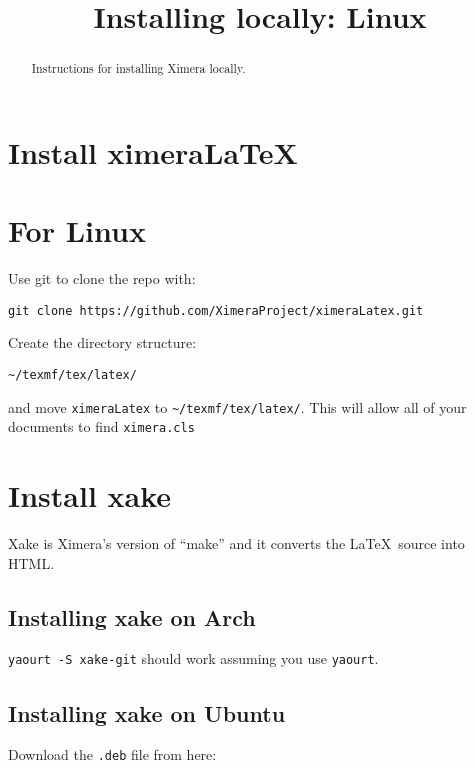 \documentclass{ximera}
\title{Installing locally: Linux}
\begin{document}
\begin{abstract}
Instructions for installing Ximera locally.
\end{abstract}
\maketitle



\section{Install ximeraLaTeX}

\section{For Linux}

Use git to clone the repo with:

\begin{verbatim}
git clone https://github.com/XimeraProject/ximeraLatex.git
\end{verbatim}

Create the directory structure:

\begin{verbatim}
~/texmf/tex/latex/
\end{verbatim}

and move \verb|ximeraLatex| to \verb|~/texmf/tex/latex/|. This will allow all of
your documents to find \verb|ximera.cls|



\section{Install xake}

Xake is Ximera's version of ``make'' and it converts the
\LaTeX\ source into HTML.

\subsection{Installing xake on Arch}

\verb!yaourt -S xake-git! should work assuming you use \texttt{yaourt}.

  
\subsection{Installing xake on Ubuntu}

Download the \verb|.deb| file from here:
\end{document}
